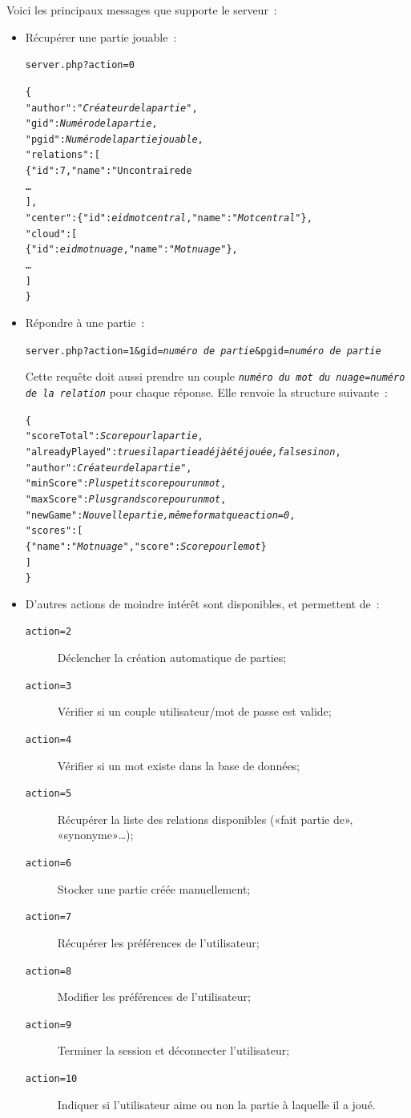\documentclass[a4paper,11pt,french]{article}
\begin{document}
Voici les principaux messages que supporte le serveur~:
\begin{itemize}
\item Récupérer une partie jouable~:

\verb!server.php?action=0!
{
\small
\begin{alltt}
\{
\quad"author":"\textit{Créateur de la partie}",
\quad"gid":\textit{Numéro de la partie},
\quad"pgid":\textit{Numéro de la partie jouable},
\quad"relations":[
\quad\quad\{"id":7,"name":"Un contraire de %
\quad\quad…
\quad],
\quad"center":\{"id":\textit{eid mot central},"name":"\textit{Mot central}"\},
\quad"cloud":[
\quad\quad\{"id":\textit{eid mot nuage},"name":"\textit{Mot nuage}"\},
\quad\quad…
\quad]
\}
\end{alltt}
}
\item Répondre à une partie~:

\verb!server.php?action=1&gid=!\textit{\texttt{numéro de partie}}\verb!&pgid=!\textit{\texttt{numéro de partie}}

Cette requête doit aussi prendre un couple \textit{\texttt{numéro du mot du nuage}}\verb!=!\textit{\texttt{numéro de la relation}} pour
chaque réponse. Elle renvoie la structure suivante~:
{
\small
\begin{alltt}
\{
\quad"scoreTotal":\textit{Score pour la partie},
\quad"alreadyPlayed":\textit{true si la partie a déjà été jouée, false sinon},
\quad"author":\textit{Créateur de la partie}",
\quad"minScore":\textit{Plus petit score pour un mot},
\quad"maxScore":\textit{Plus grand score pour un mot},
\quad"newGame":\textit{Nouvelle partie, même format que action=0},
\quad"scores":[
\quad\quad\{"name":"\textit{Mot nuage}", "score":\textit{Score pour le mot}\}
\quad]
\}
\end{alltt}
}

\item D'autres actions de moindre intérêt sont disponibles, et permettent de~:
\begin{description}
\item[\verb!action=2!] Déclencher la création automatique de parties;
\item[\verb!action=3!] Vérifier si un couple utilisateur/mot de passe est valide;
\item[\verb!action=4!] Vérifier si un mot existe dans la base de données;
\item[\verb!action=5!] Récupérer la liste des relations disponibles («fait partie de», «synonyme»…);
\item[\verb!action=6!] Stocker une partie créée manuellement;
\item[\verb!action=7!] Récupérer les préférences de l'utilisateur;
\item[\verb!action=8!] Modifier les préférences de l'utilisateur;
\item[\verb!action=9!] Terminer la session et déconnecter l'utilisateur;
\item[\verb!action=10!] Indiquer si l'utilisateur aime ou non la partie à laquelle il a joué.
\end{description}

\end{itemize}
\end{document}

